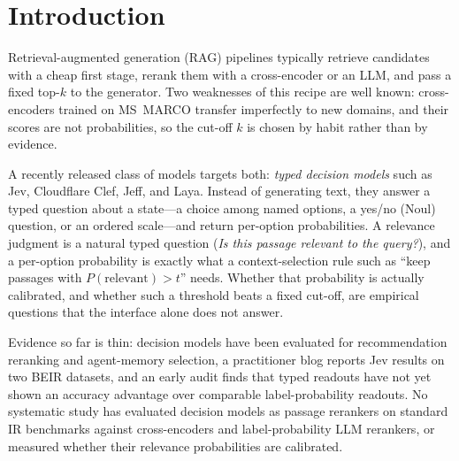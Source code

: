 \section{Introduction}

Retrieval-augmented generation (RAG) pipelines typically retrieve candidates with a cheap first stage, rerank them with a cross-encoder\cite{nogueira2019monobert} or an LLM\cite{sun2023rankgpt}, and pass a fixed top-$k$ to the generator.
Two weaknesses of this recipe are well known: cross-encoders trained on MS~MARCO transfer imperfectly to new domains\cite{thakur2021beir}, and their scores are not probabilities\cite{penha2021calibration}, so the cut-off $k$ is chosen by habit rather than by evidence.

A recently released class of models targets both: \emph{typed decision models} such as Jev\cite{jev}, Cloudflare Clef\cite{clef}, Jeff\cite{jeff}, and Laya\cite{laya}.
Instead of generating text, they answer a typed question about a state---a choice among named options, a yes/no (Noul) question, or an ordered scale---and return per-option probabilities.
A relevance judgment is a natural typed question (\emph{Is this passage relevant to the query?}), and a per-option probability is exactly what a context-selection rule such as ``keep passages with $P(\text{relevant})>t$'' needs. Whether that probability is actually calibrated, and whether such a threshold beats a fixed cut-off, are empirical questions that the interface alone does not answer.

Evidence so far is thin: decision models have been evaluated for recommendation reranking\cite{lyu2026jevrec} and agent-memory selection\cite{sharma2026selection}, a practitioner blog reports Jev results on two BEIR datasets\cite{denser2026jevqwen}, and an early audit finds that typed readouts have not yet shown an accuracy advantage over comparable label-probability readouts\cite{tang2026tdmaudit}.
No systematic study has evaluated decision models as passage rerankers on standard IR benchmarks against cross-encoders and label-probability LLM rerankers, or measured whether their relevance probabilities are calibrated.

